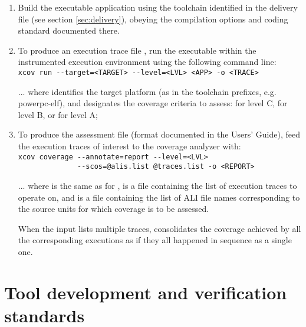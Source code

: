 \documentclass {report}
\begin{document}
\begin{enumerate}
\item Build the executable application using the \gnatp{} toolchain identified
  in the delivery file (see section \ref{sec:delivery}), obeying the
  compilation options and coding standard documented there.

\item To produce an execution trace file , run the 
  executable within the instrumented execution environment using the
  following command line:\\

{\small
\verb|xcov run --target=<TARGET> --level=<LVL> <APP> -o <TRACE>| \\
}

... where  identifies the target platform (as in the \gnatp{}
toolchain prefixes, e.g.  powerpc-elf), and  designates the coverage
criteria to assess:  for level C,  for level B, or
 for level A;

\item To produce the assessment  file (format documented in
  the \xcov{} Users' Guide), feed the execution traces
  of interest to the coverage analyzer with:\\

{\small
\verb|xcov coverage --annotate=report --level=<LVL>| \\
\verb|              --scos=@alis.list @traces.list -o <REPORT>| \\
}

... where  is the same as for ,  is a
file containing the list of execution traces to operate on, and 
is a file containing the list of \gnatp{} ALI file names corresponding to the
source units for which coverage is to be assessed.

When the  input lists multiple traces, \xcov{} consolidates the
coverage achieved by all the corresponding executions as if they all happened
in sequence as a single one.

\end{enumerate}


\chapter{Tool development and verification standards}
\end{document}
